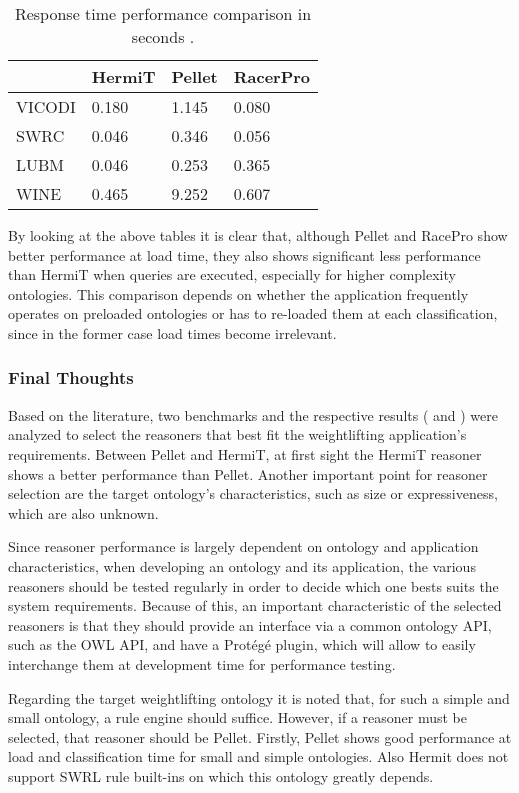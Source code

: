 \begin{table}[]
\centering
\caption{Response time performance comparison in seconds \cite{Bock2008}.}
\begin{tabular}{|l|l|l|l|}
\hline
          &  HermiT  &  Pellet  & RacerPro \\ \hline
VICODI    &    0.180  &  1.145  & 0.080 \\ \hline
SWRC      &    0.046  &  0.346  & 0.056 \\ \hline
LUBM      &    0.046  &  0.253  & 0.365 \\ \hline
WINE      &    0.465  &  9.252  & 0.607 \\ \hline
\end{tabular}
\label{tab:4}
\end{table}

By looking at the above tables it is clear that, although Pellet and RacePro show better performance at load time, they also shows significant less performance than HermiT when queries are executed, especially for higher complexity ontologies. This comparison depends on whether the application frequently operates on preloaded ontologies or has to re-loaded them at each classification, since in the former case load times become irrelevant. 


\subsubsection{Final Thoughts}

Based on the literature, two benchmarks and the respective results (\cite{Dentler2011} and \cite{Bock2008}) were analyzed to select the reasoners that best fit the weightlifting application's requirements. Between Pellet and HermiT, at first sight the HermiT reasoner shows a better performance than Pellet.  Another important point for reasoner selection are the target ontology's characteristics, such as size or expressiveness, which are also unknown. 

Since reasoner performance is largely dependent on ontology and application characteristics, when developing an ontology and its application, the various reasoners should be tested regularly in order to decide which one bests suits the system requirements. Because of this, an important characteristic of the selected reasoners is that they should provide an interface via a common ontology API, such as the OWL API, and have a Protégé plugin, which will allow to easily interchange them at development time for performance testing. 

Regarding the target weightlifting ontology it is noted that, for such a simple and small ontology, a rule engine should suffice. However, if a reasoner must be selected, that reasoner should be Pellet. Firstly, Pellet shows good performance  at load and classification time for small and simple ontologies. Also Hermit does not support SWRL rule built-ins on which this ontology greatly depends.
